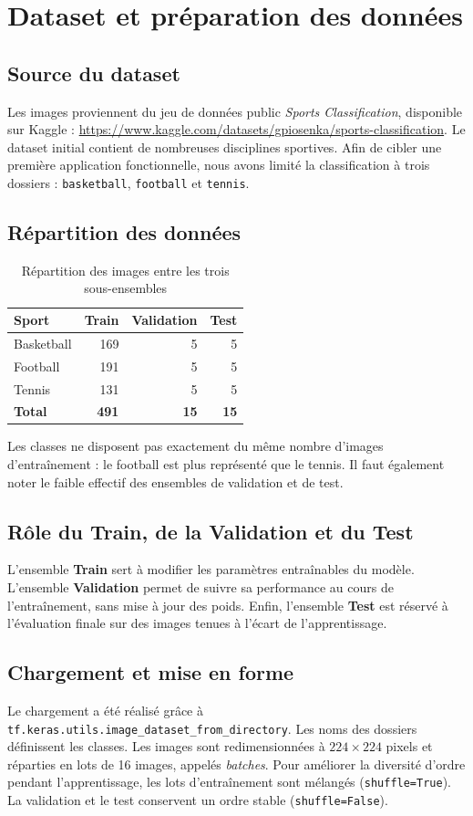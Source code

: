 \documentclass[11pt,a4paper,oneside]{report}
\begin{document}
\chapter{Dataset et préparation des données}
\section{Source du dataset}
Les images proviennent du jeu de données public \emph{Sports Classification}, disponible sur Kaggle : \url{https://www.kaggle.com/datasets/gpiosenka/sports-classification}. Le dataset initial contient de nombreuses disciplines sportives. Afin de cibler une première application fonctionnelle, nous avons limité la classification à trois dossiers : \texttt{basketball}, \texttt{football} et \texttt{tennis}.
\section{Répartition des données}
\begin{table}[H]\centering
\caption{Répartition des images entre les trois sous-ensembles}
\begin{tabular}{lrrr}
\toprule
\textbf{Sport} & \textbf{Train} & \textbf{Validation} & \textbf{Test}\\
\midrule
Basketball &169&5&5\\
Football &191&5&5\\
Tennis &131&5&5\\
\midrule
\textbf{Total}&\textbf{491}&\textbf{15}&\textbf{15}\\
\bottomrule
\end{tabular}
\end{table}
Les classes ne disposent pas exactement du même nombre d'images d'entraînement : le football est plus représenté que le tennis. Il faut également noter le faible effectif des ensembles de validation et de test.
\section{Rôle du Train, de la Validation et du Test}
L'ensemble \textbf{Train} sert à modifier les paramètres entraînables du modèle. L'ensemble \textbf{Validation} permet de suivre sa performance au cours de l'entraînement, sans mise à jour des poids. Enfin, l'ensemble \textbf{Test} est réservé à l'évaluation finale sur des images tenues à l'écart de l'apprentissage.
\section{Chargement et mise en forme}
Le chargement a été réalisé grâce à \texttt{tf.keras.utils.image\_dataset\_from\_directory}. Les noms des dossiers définissent les classes. Les images sont redimensionnées à $224\times224$ pixels et réparties en lots de 16 images, appelés \emph{batches}. Pour améliorer la diversité d'ordre pendant l'apprentissage, les lots d'entraînement sont mélangés (\texttt{shuffle=True}). La validation et le test conservent un ordre stable (\texttt{shuffle=False}).
\end{document}
